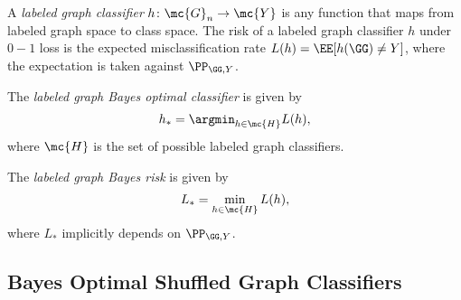 
	A \emph{labeled graph classifier} $h\colon \mc{G}_n \to \mc{Y}$ is any function that maps from labeled graph space to class space. The risk of a labeled graph classifier $h$ under $0-1$ loss is the expected misclassification rate $L(h)=\EE[h(\GG)\neq Y]$, where the expectation is taken against $\PP_{\GG,Y}$.
	
	The \emph{labeled graph Bayes optimal classifier} is given by
	\begin{align}
		h_* = \argmin_{h \in \mc{H}} L(h),
	\end{align}
	where $\mc{H}$ is the set of possible labeled graph classifiers.
	
	The \emph{labeled graph Bayes risk} is given by 
	\begin{align}
		L_* =\min_{h \in \mc{H}} L(h),
	\end{align}
	where $L_*$ implicitly depends on $\PP_{\GG,Y}$.




\subsection{Bayes Optimal Shuffled Graph Classifiers} %

